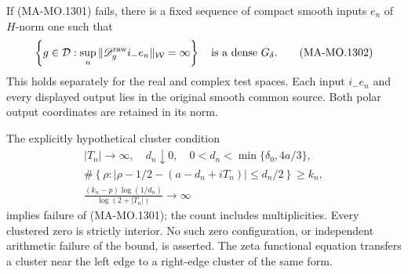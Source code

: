 If (MA-MO.1301) fails, there is a fixed sequence of compact smooth
inputs $e_n$ of $H$-norm one such that
\[
 \left\{g\in\mathcal D:
       \sup_n\|\mathscr D_g^{\rm raw}i_-e_n\|_{\mathcal W}=\infty\right\}
       \quad\text{is a dense }G_\delta.
 \tag{MA-MO.1302}
\]
This holds separately for the real and complex test spaces.
Each input $i_-e_n$ and every displayed output lies in the
original smooth common source.  Both polar output coordinates
are retained in its norm.

The explicitly hypothetical cluster condition
\[
 \begin{gathered}
 |T_n|\to\infty,\quad d_n\downarrow0,\quad
 0<d_n<\min\{\delta_0,4a/3\},\\
 \#\left\{\rho:\left|\rho-1/2-(a-d_n+iT_n)\right|
                           \le d_n/2\right\}\ge k_n,\\
 \frac{(k_n-p)\log(1/d_n)}{\log(2+|T_n|)}\longrightarrow\infty
 \end{gathered}
 \tag{MA-MO.1303}
\]
implies failure of (MA-MO.1301); the count includes multiplicities.
Every clustered zero is strictly interior.  No such zero
configuration, or independent arithmetic failure of the bound,
is asserted.  The zeta functional equation transfers a cluster
near the left edge to a right-edge cluster of the same form.

